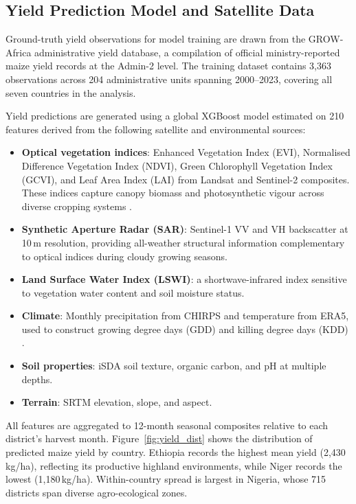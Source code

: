 \subsection{Yield Prediction Model and Satellite Data}

Ground-truth yield observations for model training are drawn from the GROW-Africa administrative yield database, a compilation of official ministry-reported maize yield records at the Admin-2 level. The training dataset contains 3,363 observations across 204 administrative units spanning 2000--2023, covering all seven countries in the analysis.

Yield predictions are generated using a global XGBoost model \citep{ChenGuestrin2016} estimated on 210 features derived from the following satellite and environmental sources:

\begin{itemize}
  \item \textbf{Optical vegetation indices}: Enhanced Vegetation Index (EVI), Normalised Difference Vegetation Index (NDVI), Green Chlorophyll Vegetation Index (GCVI), and Leaf Area Index (LAI) from Landsat and Sentinel-2 composites. These indices capture canopy biomass and photosynthetic vigour across diverse cropping systems \citep{BurkeLobell2017}.
  \item \textbf{Synthetic Aperture Radar (SAR)}: Sentinel-1 VV and VH backscatter at 10\,m resolution, providing all-weather structural information complementary to optical indices during cloudy growing seasons.
  \item \textbf{Land Surface Water Index (LSWI)}: a shortwave-infrared index sensitive to vegetation water content and soil moisture status.
  \item \textbf{Climate}: Monthly precipitation from CHIRPS and temperature from ERA5, used to construct growing degree days (GDD) and killing degree days (KDD) \citep{Schlenker_Roberts2009}.
  \item \textbf{Soil properties}: iSDA soil texture, organic carbon, and pH at multiple depths.
  \item \textbf{Terrain}: SRTM elevation, slope, and aspect.
\end{itemize}

All features are aggregated to 12-month seasonal composites relative to each district's harvest month. Figure~\ref{fig:yield_dist} shows the distribution of predicted maize yield by country. Ethiopia records the highest mean yield (2,430\,kg/ha), reflecting its productive highland environments, while Niger records the lowest (1,180\,kg/ha). Within-country spread is largest in Nigeria, whose 715 districts span diverse agro-ecological zones.

